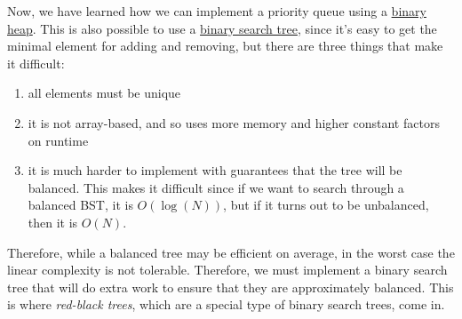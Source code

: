   Now, we have learned how we can implement a priority queue using a \hyperref[def:binary-heap]{binary heap}. This is also possible to use a \hyperref[def:binary-search-tree]{binary search tree}, since it's easy to get the minimal element for adding and removing, but there are three things that make it difficult: 
  \begin{enumerate}
      \item all elements must be unique 
      \item it is not array-based, and so uses more memory and higher constant factors on runtime 
      \item it is much harder to implement with guarantees that the tree will be balanced. This makes it difficult since if we want to search through a balanced BST, it is $O(\log(N))$, but if it turns out to be unbalanced, then it is $O(N)$. 
  \end{enumerate}
  Therefore, while a balanced tree may be efficient on average, in the worst case the linear complexity is not tolerable. Therefore, we must implement a binary search tree that will do extra work to ensure that they are approximately balanced. This is where \textit{red-black trees}, which are a special type of binary search trees, come in.  

